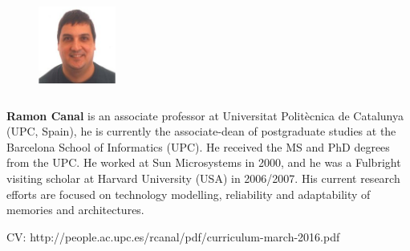 \documentclass{article}
\begin{document}
  \begin{figure} 
      \includegraphics[width=1in,height=1.25in,clip,keepaspectratio]{pictures/ramon.jpg}
  \end{figure}\par
  \textbf{Ramon Canal} is an associate professor at Universitat Polit\`ecnica de Catalunya (UPC, Spain), he is currently the associate-dean of postgraduate studies at the Barcelona School of Informatics (UPC). He received the MS and PhD degrees from the UPC. He worked at Sun Microsystems in 2000, and he was a Fulbright visiting scholar at Harvard University (USA) in 2006/2007. His current research efforts are focused on technology modelling, reliability and adaptability of memories and architectures.
  
  CV: http://people.ac.upc.es/rcanal/pdf/curriculum-march-2016.pdf
  \par
\end{document}
